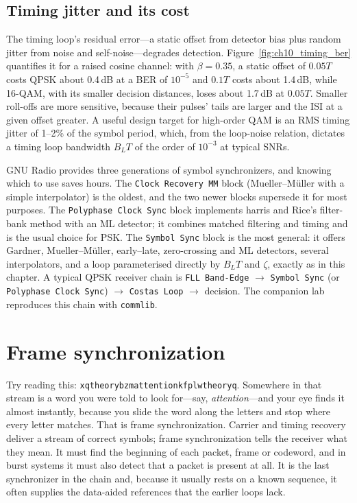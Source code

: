 \subsection{Timing jitter and its cost}

The timing loop's residual error---a static offset from detector bias plus random jitter from
noise and self-noise---degrades detection. Figure~\ref{fig:ch10_timing_ber} quantifies it for a raised
cosine channel: with $\beta=0.35$, a static offset of $0.05T$ costs QPSK about 0.4\,dB at a BER of
$10^{-5}$ and $0.1T$ costs about 1.4\,dB, while 16-QAM, with its smaller decision distances, loses about
1.7\,dB at $0.05T$. Smaller roll-offs are more sensitive, because their pulses' tails are larger and the
ISI at a given offset greater. A useful design target for high-order QAM is an RMS timing jitter of
1--2\% of the symbol period, which, from the loop-noise relation, dictates a timing loop bandwidth
$B_LT$ of the order of $10^{-3}$ at typical SNRs.

\begin{inpractice}
GNU Radio provides three generations of symbol synchronizers, and knowing which to use saves hours.
The \texttt{Clock Recovery MM} block (Mueller--M\"uller with a simple interpolator) is the oldest,
and the two newer blocks supersede it for most purposes. The \texttt{Polyphase Clock Sync} block implements harris and Rice's filter-bank
method with an ML detector; it combines matched filtering and timing and is the usual choice for PSK.
The \texttt{Symbol Sync} block is the most general: it offers Gardner, Mueller--M\"uller, early--late,
zero-crossing and ML detectors, several interpolators, and a loop parameterised directly by $B_LT$ and
$\zeta$, exactly as in this chapter. A typical QPSK receiver chain is \texttt{FLL Band-Edge}
$\rightarrow$ \texttt{Symbol Sync} (or \texttt{Polyphase Clock Sync}) $\rightarrow$ \texttt{Costas Loop}
$\rightarrow$ decision. The companion lab reproduces this chain with \texttt{commlib}.
\end{inpractice}

\section{Frame synchronization}
\label{sec:ch10:frame}

Try reading this: \texttt{xqtheorybzmattentionkfplwtheoryq}. Somewhere in that stream is a word
you were told to look for---say, \emph{attention}---and your eye finds it almost instantly, because
you slide the word along the letters and stop where every letter matches. That is frame
synchronization. Carrier and timing recovery deliver a stream of correct symbols; frame
synchronization tells the receiver what they mean. It must find the beginning of each packet, frame
or codeword, and in burst systems it must also detect that a packet is present at all. It is the
last synchronizer in the chain and, because it usually rests on a known sequence, it often supplies
the data-aided references that the earlier loops lack.

